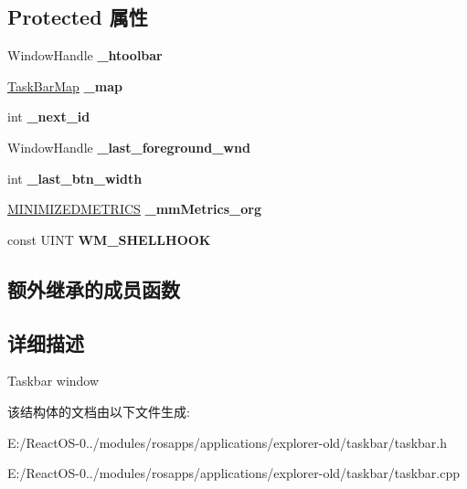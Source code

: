 \subsection*{Protected 属性}
\begin{DoxyCompactItemize}
\item 
\mbox{\label{struct_task_bar_a2867d7dd7599c8a9eb7e049a53d5807c}} 
Window\+Handle {\bfseries \+\_\+htoolbar}
\item 
\mbox{\label{struct_task_bar_a791d4862fcb1f8a9c95adc4c4f7ecb2b}} 
\hyperlink{struct_task_bar_map}{Task\+Bar\+Map} {\bfseries \+\_\+map}
\item 
\mbox{\label{struct_task_bar_a70a8d60e146ea127b046a7cdade1c64b}} 
int {\bfseries \+\_\+next\+\_\+id}
\item 
\mbox{\label{struct_task_bar_a5d3d8868ff8396e2d42a2a37a92e7bb4}} 
Window\+Handle {\bfseries \+\_\+last\+\_\+foreground\+\_\+wnd}
\item 
\mbox{\label{struct_task_bar_a13e294f0ba327151c64ef2944cc20c37}} 
int {\bfseries \+\_\+last\+\_\+btn\+\_\+width}
\item 
\mbox{\label{struct_task_bar_aaf5efca46e8538bd32d34f4bfa94f6ac}} 
\hyperlink{structtag_m_i_n_i_m_i_z_e_d_m_e_t_r_i_c_s}{M\+I\+N\+I\+M\+I\+Z\+E\+D\+M\+E\+T\+R\+I\+CS} {\bfseries \+\_\+mm\+Metrics\+\_\+org}
\item 
\mbox{\label{struct_task_bar_aa94edf151fd2083b3ae300a5c9eb54e3}} 
const U\+I\+NT {\bfseries W\+M\+\_\+\+S\+H\+E\+L\+L\+H\+O\+OK}
\end{DoxyCompactItemize}
\subsection*{额外继承的成员函数}


\subsection{详细描述}
Taskbar window 

该结构体的文档由以下文件生成\+:\begin{DoxyCompactItemize}
\item 
E\+:/\+React\+O\+S-\/0../modules/rosapps/applications/explorer-\/old/taskbar/taskbar.\+h\item 
E\+:/\+React\+O\+S-\/0../modules/rosapps/applications/explorer-\/old/taskbar/taskbar.\+cpp\end{DoxyCompactItemize}
